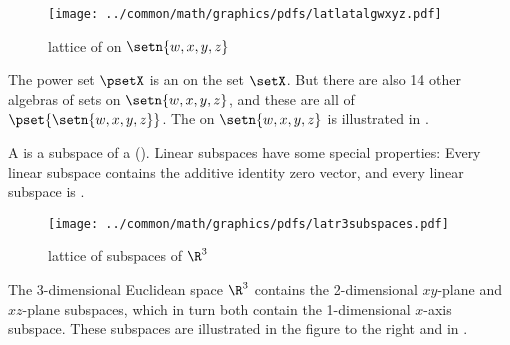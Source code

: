 
\begin{figure}
  \centering
  \texttt{[image: ../common/math/graphics/pdfs/latlatalgwxyz.pdf]}
  \caption{%
    lattice of  on $\setn{w,x,y,z}$ 
    \label{fig:algsets_wxyz}
    }
\end{figure}
\begin{example}
\label{ex:algsets_wxyz}
The power set $\psetX$ is an  on the set $\setX$.
But there are also 14 other algebras of sets on $\setn{w,x,y,z}$, and these are all  of $\pset{\setn{w,x,y,z}}$.
The  on $\setn{w,x,y,z}$ is illustrated in . 
\end{example}%

A  is a subspace of a  ().
Linear subspaces have some special properties: 
Every linear subspace contains the additive identity zero vector, and every linear subspace is .

\begin{figure}[th]
  \centering
  \texttt{[image: ../common/math/graphics/pdfs/latr3subspaces.pdf]}
  \caption{lattice of subspaces of $\R^3$ \label{fig:latr3subspaces}}
\end{figure}
\begin{minipage}{\tw-63mm}
\begin{example}\label{ex:r3subspaces}
  The 3-dimensional Euclidean space $\R^3$ contains 
  the 2-dimensional $xy$-plane and $xz$-plane subspaces,
  which in turn both contain the 1-dimensional $x$-axis subspace.
  These subspaces are illustrated in the figure to the right and in .
\end{example}
\end{minipage}\hfill%

